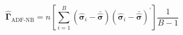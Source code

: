 \begin{equation}
    \hat{\boldsymbol{\Gamma}}_{\text{ADF-NB}}
    =
    n
    \left[
    \sum_{i = 1}^{B}
    \left(
    \hat{\boldsymbol{\sigma}}_i
    -
    \bar{\hat{\boldsymbol{\sigma}}}
    \right)
    \left(
    \hat{\boldsymbol{\sigma}}_i
    -
    \bar{\hat{\boldsymbol{\sigma}}}
    \right)^{\prime}
    \right]
    \frac{1}{B - 1}
    \label{eq:gammaMatrix-gammacap-adfnb}
\end{equation}
